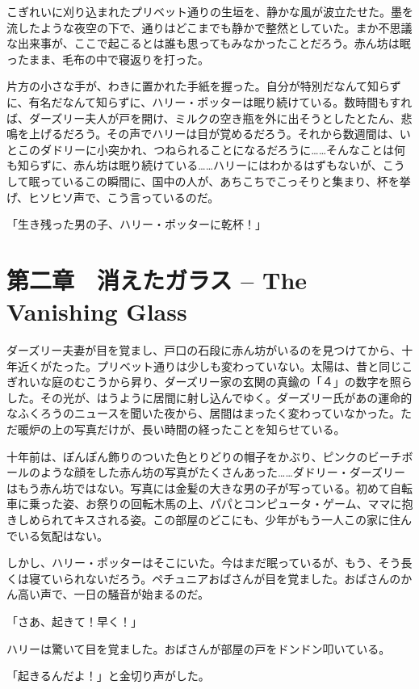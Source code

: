 \documentclass[10pt,a4paper]{article}
\begin{document}
\begin{CJK}{UTF8}{min}
こぎれいに刈り込まれたプリベット通りの生垣を、静かな風が波立たせた。墨を流したような夜空の下で、通りはどこまでも静かで整然としていた。まか不思議な出来事が、ここで起こるとは誰も思ってもみなかったことだろう。赤ん坊は眠ったまま、毛布の中で寝返りを打った。

片方の小さな手が、わきに置かれた手紙を握った。自分が特別だなんて知らずに、有名だなんて知らずに、ハリー・ポッターは眠り続けている。数時間もすれば、ダーズリー夫人が戸を開け、ミルクの空き瓶を外に出そうとしたとたん、悲鳴を上げるだろう。その声でハリーは目が覚めるだろう。それから数週間は、いとこのダドリーに小突かれ、つねられることになるだろうに……そんなことは何も知らずに、赤ん坊は眠り続けている……ハリーにはわかるはずもないが、こうして眠っているこの瞬間に、国中の人が、あちこちでこっそりと集まり、杯を挙げ、ヒソヒソ声で、こう言っているのだ。

「生き残った男の子、ハリー・ポッターに乾杯！」




\section{第二章　消えたガラス -- The Vanishing Glass}

ダーズリー夫妻が目を覚まし、戸口の石段に赤ん坊がいるのを見つけてから、十年近くがたった。プリベット通りは少しも変わっていない。太陽は、昔と同じこぎれいな庭のむこうから昇り、ダーズリー家の玄関の真鍮の「４」の数字を照らした。その光が、はうように居間に射し込んでゆく。ダーズリー氏があの運命的なふくろうのニュースを聞いた夜から、居間はまったく変わっていなかった。ただ暖炉の上の写真だけが、長い時間の経ったことを知らせている。

十年前は、ぽんぽん飾りのついた色とりどりの帽子をかぶり、ピンクのビーチボールのような顔をした赤ん坊の写真がたくさんあった……ダドリー・ダーズリーはもう赤ん坊ではない。写真には金髪の大きな男の子が写っている。初めて自転車に乗った姿、お祭りの回転木馬の上、パパとコンピュータ・ゲーム、ママに抱きしめられてキスされる姿。この部屋のどこにも、少年がもう一人この家に住んでいる気配はない。

しかし、ハリー・ポッターはそこにいた。今はまだ眠っているが、もう、そう長くは寝ていられないだろう。ペチュニアおばさんが目を覚ました。おばさんのかん高い声で、一日の騒音が始まるのだ。

「さあ、起きて！早く！」

ハリーは驚いて目を覚ました。おばさんが部屋の戸をドンドン叩いている。

「起きるんだよ！」と金切り声がした。


\end{CJK}
\end{document}
